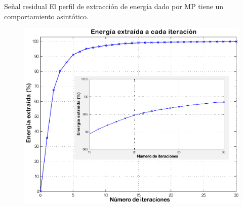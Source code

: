 \documentclass[xcolor=table]{beamer}
\begin{document}
\begin{frame}{Se\~nal residual}
El perfil de extracci\'on de energ\'ia dado por MP tiene un comportamiento asint\'otico.
	\begin{figure}
		\centering
		\includegraphics[scale=0.4]{perfil_energia_extraida.pdf}
	\end{figure}		
\end{frame}
%
\end{document}
